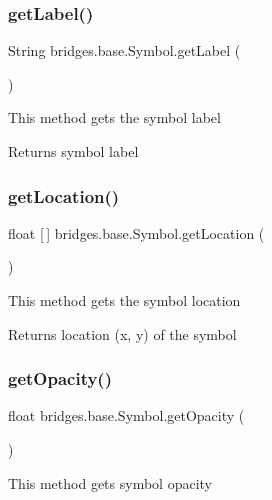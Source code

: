 \subsubsection{\texorpdfstring{get\+Label()}{getLabel()}}
{\footnotesize\ttfamily String bridges.\+base.\+Symbol.\+get\+Label (\begin{DoxyParamCaption}{ }\end{DoxyParamCaption})}

This method gets the symbol label

\begin{DoxyReturn}{Returns}
symbol label 
\end{DoxyReturn}
\mbox{\label{classbridges_1_1base_1_1_symbol_a67d925fa6fcf9b78c449b63182029e56}} 
\subsubsection{\texorpdfstring{get\+Location()}{getLocation()}}
{\footnotesize\ttfamily float \mbox{[}$\,$\mbox{]} bridges.\+base.\+Symbol.\+get\+Location (\begin{DoxyParamCaption}{ }\end{DoxyParamCaption})}

This method gets the symbol location

\begin{DoxyReturn}{Returns}
location (x, y) of the symbol 
\end{DoxyReturn}
\mbox{\label{classbridges_1_1base_1_1_symbol_af249b2a8a11a70edc8f51ee19e6cd927}} 
\subsubsection{\texorpdfstring{get\+Opacity()}{getOpacity()}}
{\footnotesize\ttfamily float bridges.\+base.\+Symbol.\+get\+Opacity (\begin{DoxyParamCaption}{ }\end{DoxyParamCaption})}

This method gets symbol opacity

